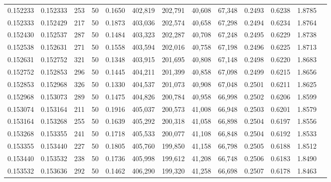 \begin{tabular}{rrrrrrrrrrrrr}
0.152233 & 0.152333 &   253 &  50 &                                     0.1650 & 402,819 & 202,791 &  40,608 &  67,348 & 0.2493 & 0.6238 & 1.8785 \\
0.152333 & 0.152429 &   217 &  50 &                                     0.1873 & 403,036 & 202,574 &  40,658 &  67,298 & 0.2494 & 0.6234 & 1.8764 \\
0.152430 & 0.152537 &   287 &  50 &                                     0.1484 & 403,323 & 202,287 &  40,708 &  67,248 & 0.2495 & 0.6229 & 1.8738 \\
0.152538 & 0.152631 &   271 &  50 &                                     0.1558 & 403,594 & 202,016 &  40,758 &  67,198 & 0.2496 & 0.6225 & 1.8713 \\
0.152631 & 0.152752 &   321 &  50 &                                     0.1348 & 403,915 & 201,695 &  40,808 &  67,148 & 0.2498 & 0.6220 & 1.8683 \\
0.152752 & 0.152853 &   296 &  50 &                                     0.1445 & 404,211 & 201,399 &  40,858 &  67,098 & 0.2499 & 0.6215 & 1.8656 \\
0.152853 & 0.152968 &   326 &  50 &                                     0.1330 & 404,537 & 201,073 &  40,908 &  67,048 & 0.2501 & 0.6211 & 1.8625 \\
0.152968 & 0.153073 &   289 &  50 &                                     0.1475 & 404,826 & 200,784 &  40,958 &  66,998 & 0.2502 & 0.6206 & 1.8599 \\
0.153074 & 0.153164 &   211 &  50 &                                     0.1916 & 405,037 & 200,573 &  41,008 &  66,948 & 0.2503 & 0.6201 & 1.8579 \\
0.153164 & 0.153268 &   255 &  50 &                                     0.1639 & 405,292 & 200,318 &  41,058 &  66,898 & 0.2504 & 0.6197 & 1.8556 \\
0.153268 & 0.153355 &   241 &  50 &                                     0.1718 & 405,533 & 200,077 &  41,108 &  66,848 & 0.2504 & 0.6192 & 1.8533 \\
0.153355 & 0.153440 &   227 &  50 &                                     0.1805 & 405,760 & 199,850 &  41,158 &  66,798 & 0.2505 & 0.6188 & 1.8512 \\
0.153440 & 0.153532 &   238 &  50 &                                     0.1736 & 405,998 & 199,612 &  41,208 &  66,748 & 0.2506 & 0.6183 & 1.8490 \\
0.153532 & 0.153636 &   292 &  50 &                                     0.1462 & 406,290 & 199,320 &  41,258 &  66,698 & 0.2507 & 0.6178 & 1.8463 \\

\end{tabular}
